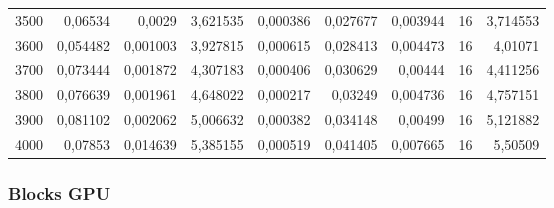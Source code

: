 \begin{tabular}{r r r r r r r r r}
3500 & 0,06534 & 0,0029 & 3,621535 & 0,000386 & 0,027677 & 0,003944 & 16 & 3,714553 \\
3600 & 0,054482 & 0,001003 & 3,927815 & 0,000615 & 0,028413 & 0,004473 & 16 & 4,01071 \\
3700 & 0,073444 & 0,001872 & 4,307183 & 0,000406 & 0,030629 & 0,00444 & 16 & 4,411256 \\
3800 & 0,076639 & 0,001961 & 4,648022 & 0,000217 & 0,03249 & 0,004736 & 16 & 4,757151 \\
3900 & 0,081102 & 0,002062 & 5,006632 & 0,000382 & 0,034148 & 0,00499 & 16 & 5,121882 \\
4000 & 0,07853 & 0,014639 & 5,385155 & 0,000519 & 0,041405 & 0,007665 & 16 & 5,50509 \\
\end{tabular}

\subsubsection{Blocks GPU}

